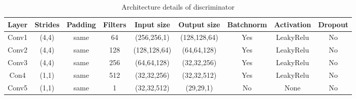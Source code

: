 \documentclass[a4paper,fleqn]{cas-dc}
\begin{document}
\begin{table}[htbp]
\caption{Architecture details of discriminator}
\begin{tabular}{|c|c|c|c|c|c|c|c|c|}
\hline
{\color[HTML]{000000} \textbf{Layer}} &
  {\color[HTML]{000000} \textbf{Strides}} &
  {\color[HTML]{000000} \textbf{Padding}} &
  {\color[HTML]{000000} \textbf{Filters}} &
  {\color[HTML]{000000} \textbf{Input size}} &
  {\color[HTML]{000000} \textbf{Output size}} &
  {\color[HTML]{000000} \textbf{Batchnorm}} &
  {\color[HTML]{000000} \textbf{Activation}} &
  {\color[HTML]{000000} \textbf{Dropout}} \\ \hline
{\color[HTML]{000000} Conv1} &
  {\color[HTML]{000000} (4,4)} &
  {\color[HTML]{000000} same} &
  {\color[HTML]{000000} 64} &
  {\color[HTML]{000000} (256,256,1)} &
  {\color[HTML]{000000} (128,128,64)} &
  {\color[HTML]{000000} Yes} &
  {\color[HTML]{000000} LeakyRelu} &
  {\color[HTML]{000000} No} \\ \hline
{\color[HTML]{000000} Conv2} &
  {\color[HTML]{000000} (4,4)} &
  {\color[HTML]{000000} same} &
  {\color[HTML]{000000} 128} &
  {\color[HTML]{000000} (128,128,64)} &
  {\color[HTML]{000000} (64,64,128)} &
  {\color[HTML]{000000} Yes} &
  {\color[HTML]{000000} LeakyRelu} &
  {\color[HTML]{000000} No} \\ \hline
{\color[HTML]{000000} Conv3} &
  {\color[HTML]{000000} (4,4)} &
  {\color[HTML]{000000} same} &
  {\color[HTML]{000000} 256} &
  {\color[HTML]{000000} (64,64,128)} &
  {\color[HTML]{000000} (32,32,256)} &
  {\color[HTML]{000000} Yes} &
  {\color[HTML]{000000} LeakyRelu} &
  {\color[HTML]{000000} No} \\ \hline
{\color[HTML]{000000} Con4} &
  {\color[HTML]{000000} (1,1)} &
  {\color[HTML]{000000} same} &
  {\color[HTML]{000000} 512} &
  {\color[HTML]{000000} (32,32,256)} &
  {\color[HTML]{000000} (32,32,512)} &
  {\color[HTML]{000000} Yes} &
  {\color[HTML]{000000} LeakyRelu} &
  {\color[HTML]{000000} No} \\ \hline
{\color[HTML]{000000} Conv5} &
  {\color[HTML]{000000} (1,1)} &
  {\color[HTML]{000000} same} &
  {\color[HTML]{000000} 1} &
  {\color[HTML]{000000} (32,32,512)} &
  {\color[HTML]{000000} (29,29,1)} &
  {\color[HTML]{000000} No} &
  {\color[HTML]{000000} None} &
  {\color[HTML]{000000} No} \\ \hline
\end{tabular}
\label{tab2}
\end{table}
\end{document}
